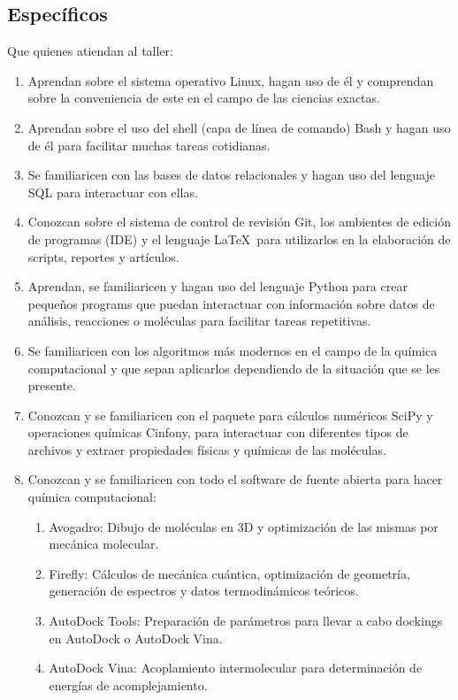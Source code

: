 \documentclass[10pt,letterpaper]{article}
\begin{document}
\subsection{Espec\'ificos}
Que quienes atiendan al taller:
\begin{enumerate}
\item Aprendan sobre el sistema operativo Linux, hagan uso de \'el y comprendan sobre la conveniencia de este en el campo de las ciencias exactas.
\item Aprendan sobre el uso del shell (capa de l\'inea de comando) Bash y hagan uso de \'el para facilitar muchas tareas cotidianas.
\item Se familiaricen con las bases de datos relacionales y hagan uso del lenguaje SQL para interactuar con ellas.
\item Conozcan sobre el sistema de control de revisi\'on Git, los ambientes de edici\'on de programas (IDE) y el lenguaje \LaTeX\ para utilizarlos en la elaboraci\'on de scripts, reportes y art\'iculos.
\item Aprendan, se familiaricen y hagan uso del lenguaje Python para crear peque\~nos programs que puedan interactuar con informaci\'on sobre datos de an\'alisis, reacciones o mol\'eculas para facilitar tareas repetitivas.
\item Se familiaricen con los algoritmos m\'as modernos en el campo de la qu\'imica computacional y que sepan aplicarlos dependiendo de la situaci\'on que se les presente.
\item Conozcan y se familiaricen con el paquete para c\'alculos num\'ericos SciPy y operaciones qu\'imicas Cinfony, para interactuar con diferentes tipos de archivos y extraer propiedades f\'isicas y qu\'imicas de las mol\'eculas.
\item Conozcan y se familiaricen con todo el software de fuente abierta para hacer qu\'imica computacional:
	\begin{enumerate}
	\item Avogadro: Dibujo de mol\'eculas en 3D y optimizaci\'on de las mismas por mec\'anica molecular.
	\item Firefly: C\'alculos de mec\'anica cu\'antica, optimizaci\'on de geometr\'ia, generaci\'on de espectros y datos termodin\'amicos te\'oricos.
	\item AutoDock Tools: Preparaci\'on de par\'ametros para llevar a cabo dockings en AutoDock o AutoDock Vina.
	\item AutoDock Vina: Acoplamiento intermolecular para determinaci\'on de energ\'ias de acomplejamiento.

\end{enumerate}
\end{enumerate}
\end{document}
